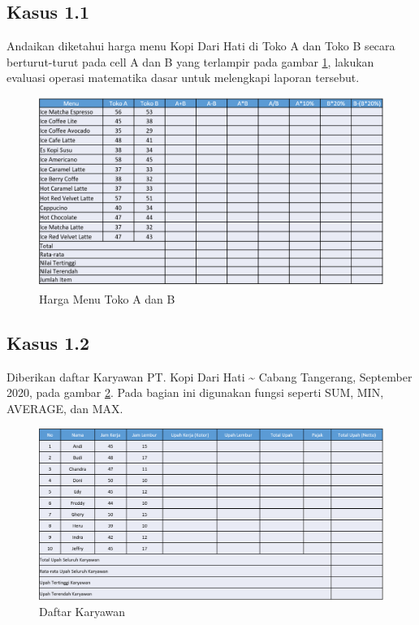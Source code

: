 \documentclass[
]{book}
\begin{document}
\hypertarget{kasus-1.1}{%
\subsection*{Kasus 1.1}\label{kasus-1.1}}

Andaikan diketahui harga menu Kopi Dari Hati di Toko A dan Toko B secara berturut-turut pada cell A dan B yang terlampir pada gambar \ref{fig:tabel1}, lakukan evaluasi operasi matematika dasar untuk melengkapi laporan tersebut.

\begin{figure}

{\centering \includegraphics[width=1\linewidth]{images/tabel1} 

}

\caption{Harga Menu Toko A dan B}\label{fig:tabel1}
\end{figure}

\hypertarget{kasus-1.2}{%
\subsection*{Kasus 1.2}\label{kasus-1.2}}

Diberikan daftar Karyawan PT. Kopi Dari Hati \textasciitilde{} Cabang Tangerang, September 2020, pada gambar \ref{fig:tabel2}. Pada bagian ini digunakan fungsi seperti SUM, MIN, AVERAGE, dan MAX.

\begin{figure}

{\centering \includegraphics[width=1\linewidth]{images/tabel2} 

}

\caption{Daftar Karyawan}\label{fig:tabel2}
\end{figure}
\end{document}
